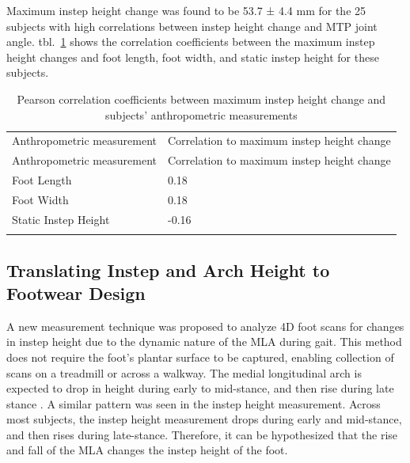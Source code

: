 \documentclass[defaultstyle,11pt]{thesis}
\begin{document}
Maximum instep height change was found to be 53.7 ± 4.4 mm for the 25 subjects with high correlations between instep height change and MTP joint angle.
tbl.~\ref{tbl:corrs} shows the correlation coefficients between the maximum instep height changes and foot length, foot width, and static instep height for these subjects.

\hypertarget{tbl:corrs}{}
\begin{longtable}[]{@{}ll@{}}
\caption{\label{tbl:corrs}Pearson correlation coefficients between maximum instep height change and subjects' anthropometric measurements}\tabularnewline
\toprule
Anthropometric measurement & Correlation to maximum instep height change \\ \addlinespace
\midrule
\endfirsthead
\toprule
Anthropometric measurement & Correlation to maximum instep height change \\ \addlinespace
\midrule
\endhead
Foot Length & 0.18 \\ \addlinespace
Foot Width & 0.18 \\ \addlinespace
Static Instep Height & -0.16 \\ \addlinespace
\bottomrule
\end{longtable}

\hypertarget{translating-instep-and-arch-height-to-footwear-design}{%
\subsection{Translating Instep and Arch Height to Footwear Design}\label{translating-instep-and-arch-height-to-footwear-design}}

A new measurement technique was proposed to analyze 4D foot scans for changes in instep height due to the dynamic nature of the MLA during gait.
This method does not require the foot's plantar surface to be captured, enabling collection of scans on a treadmill or across a walkway.
The medial longitudinal arch is expected to drop in height during early to mid-stance, and then rise during late stance \citep{Hicks1954, Ker1987, Caravaggi2010, Cashmere1999, Leardini2007, Stolwijk2014, Welte2018, Welte2021}.
A similar pattern was seen in the instep height measurement.
Across most subjects, the instep height measurement drops during early and mid-stance, and then rises during late-stance. Therefore, it can be hypothesized that the rise and fall of the MLA changes the instep height of the foot.
\end{document}
